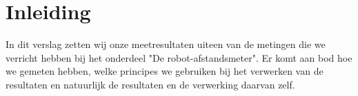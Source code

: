 \documentclass{report}
\begin{document}
\chapter{Inleiding}
In dit verslag zetten wij onze meetresultaten uiteen van de metingen die we verricht hebben bij het onderdeel "De robot-afstandsmeter". Er komt aan bod hoe we gemeten hebben, welke principes we gebruiken bij het verwerken van de resultaten en natuurlijk de resultaten en de verwerking daarvan zelf.
\end{document}
